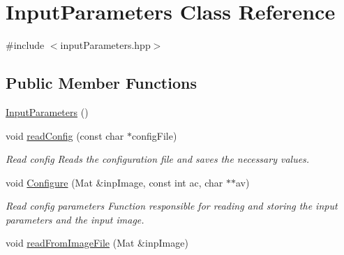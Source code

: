 \hypertarget{classInputParameters}{}\section{Input\+Parameters Class Reference}
\label{classInputParameters}


{\ttfamily \#include $<$input\+Parameters.\+hpp$>$}

\subsection*{Public Member Functions}
\begin{DoxyCompactItemize}
\item 
\mbox{\hyperlink{classInputParameters_a2ede6d73636729561755f9ca986475f8}{Input\+Parameters}} ()
\item 
void \mbox{\hyperlink{classInputParameters_ad6f1b367bcdc1dfc0264ae174d593a91}{read\+Config}} (const char $\ast$config\+File)
\begin{DoxyCompactList}\small\item\em Read config Reads the configuration file and saves the necessary values. \end{DoxyCompactList}\item 
void \mbox{\hyperlink{classInputParameters_a1336d233e7d6114fdae7dca422a34f17}{Configure}} (Mat \&inp\+Image, const int ac, char $\ast$$\ast$av)
\begin{DoxyCompactList}\small\item\em Read config parameters Function responsible for reading and storing the input parameters and the input image. \end{DoxyCompactList}\item 
void \mbox{\hyperlink{classInputParameters_a3fbb650aef6f1e08d2bfea252d0386ee}{read\+From\+Image\+File}} (Mat \&inp\+Image)
\end{DoxyCompactItemize}
